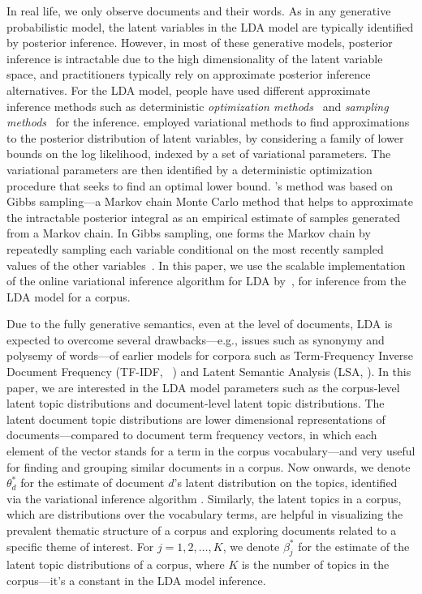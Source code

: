 In real life, we only observe documents and their words. 
As in any generative probabilistic model, the latent variables in 
the LDA model are typically identified by posterior inference. 
However, in most of these generative models, posterior inference is 
intractable due to the high dimensionality of the latent variable 
space, and practitioners typically rely on approximate posterior 
inference alternatives. For the LDA model, people have used 
different approximate inference methods such as deterministic 
\textsl{optimization methods}~\cite{Blei2003} and \textsl{sampling 
methods}~\cite{Griffiths2004} for the inference. 
\citeauthor{Blei2003} employed variational methods to find 
approximations to the posterior distribution of latent variables, by 
considering a family of lower bounds on the log likelihood, indexed 
by a set of variational parameters. The variational parameters are 
then identified by a deterministic optimization procedure that seeks 
to find an optimal lower bound. \citeauthor{Griffiths2004}'s method 
was based on Gibbs sampling---a Markov chain Monte Carlo 
method that helps to approximate the intractable posterior integral 
as an empirical estimate of samples generated from a Markov chain.   
In Gibbs sampling, one forms the Markov chain by repeatedly sampling 
each variable conditional on the most recently sampled values of the 
other variables~\cite{Geman1984}. In this paper, we use the scalable 
implementation of the online variational inference algorithm for LDA
\cite{hoffman2010online} by~\cite{rehurek_lrec}, for inference from 
the LDA model for a corpus. 


Due to the fully generative semantics, even at the level of 
documents, LDA is expected to overcome several drawbacks---e.g., 
issues such as synonymy and polysemy of words---of earlier models 
for corpora such as Term-Frequency Inverse Document Frequency 
(TF-IDF, \citeauthor{Salton1975}~\citeyear{Salton1975}) and Latent 
Semantic Analysis (LSA, \citeauthor{Dumais1995} 
\citeyear{Dumais1995}). In this paper, we are interested in the LDA 
model parameters such as the corpus-level latent topic distributions 
and document-level latent topic distributions. The latent document 
topic distributions are lower dimensional representations of 
documents---compared to document term frequency vectors, in which 
each element of the vector stands for a term in the corpus 
vocabulary---and very useful for finding and grouping similar 
documents in a corpus. Now onwards, we denote $\theta_d^{*}$ for the 
estimate of document $d$'s latent distribution on the topics, 
identified via the variational inference algorithm 
\cite{hoffman2010online}. Similarly, the latent topics in a corpus, 
which are distributions over the vocabulary terms, are helpful in 
visualizing the prevalent thematic structure of a corpus and 
exploring documents related to a specific theme of interest. For 
$j = 1, 2, \ldots, K$, we denote $\beta_j^{*}$ for the estimate of 
the latent topic distributions of a corpus, where $K$ is the number 
of topics in the corpus---it's a constant in the LDA model inference.  








